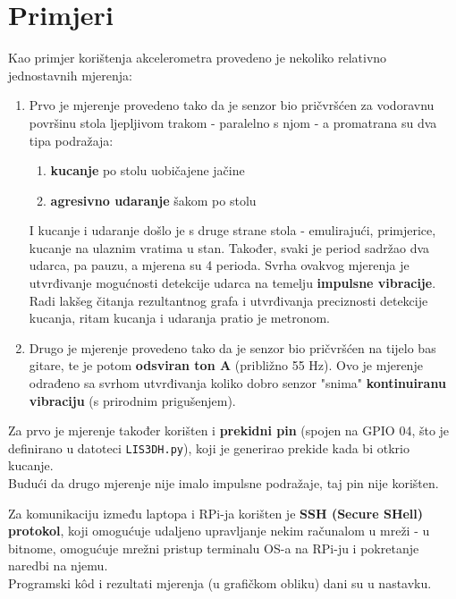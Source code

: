 \documentclass[12pt,a4paper]{article}
\begin{document}


\newpage
\section{Primjeri}
	Kao primjer korištenja akcelerometra provedeno je nekoliko relativno jednostavnih mjerenja:
	\begin{enumerate}
		\item Prvo je mjerenje provedeno tako da je senzor bio pričvršćen za vodoravnu površinu stola ljepljivom trakom - paralelno s njom - a promatrana su dva tipa podražaja:
		\begin{enumerate}
			\item \textbf{kucanje} po stolu uobičajene jačine
			\item \textbf{agresivno udaranje} šakom po stolu
		\end{enumerate}
		I kucanje i udaranje došlo je s druge strane stola - emulirajući, primjerice, kucanje na ulaznim vratima u stan. Također, svaki je period sadržao dva udarca, pa pauzu, a mjerena su 4 perioda. Svrha ovakvog mjerenja je utvrđivanje mogućnosti detekcije udarca na temelju \textbf{impulsne vibracije}. Radi lakšeg čitanja rezultantnog grafa i utvrđivanja preciznosti detekcije kucanja, ritam kucanja i udaranja pratio je metronom.
		\item Drugo je mjerenje provedeno tako da je senzor bio pričvršćen na tijelo bas gitare, te je potom \textbf{odsviran ton A} (približno 55 Hz). Ovo je mjerenje odrađeno sa svrhom utvrđivanja koliko dobro senzor "snima" \textbf{kontinuiranu vibraciju} (s prirodnim prigušenjem).
	\end{enumerate}

	Za prvo je mjerenje također korišten i \textbf{prekidni pin} (spojen na GPIO 04, što je definirano u datoteci \texttt{LIS3DH.py}), koji je generirao prekide kada bi otkrio kucanje.\\
	Budući da drugo mjerenje nije imalo impulsne podražaje, taj pin nije korišten. \\

	\par Za komunikaciju između laptopa i RPi-ja korišten je \textbf{SSH (Secure SHell) protokol}, koji omogućuje udaljeno upravljanje nekim računalom u mreži - u bitnome, omogućuje mrežni pristup terminalu OS-a na RPi-ju i pokretanje naredbi na njemu. \\

	Programski kôd i rezultati mjerenja (u grafičkom obliku) dani su u nastavku. \\
\end{document}
